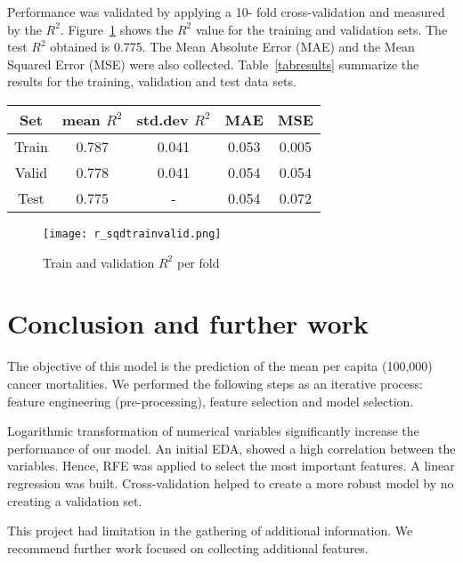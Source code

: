 \documentclass[twocolumn]{article}
\begin{document}
Performance was validated by applying a 10- fold cross-validation and measured by the $R^2$. Figure~\ref{fig:rsqrd_trainval} shows the $R^2$ value for the training and validation sets. The test $R^2$ obtained is 0.775. The Mean Absolute Error (MAE) and the Mean Squared Error (MSE) were also collected. Table~\ref{tabresults} summarize the results for the training, validation and test data sets.

\begin{center}\label{tabresults}
\begin{tabular}{ |c|c|c|c|c| } 
 \hline
 Set   &mean $R^2$ &std.dev $R^2$   & MAE   & MSE \\
 \hline
 Train      &0.787      & 0.041                     &0.053  &0.005 \\ 
 Valid &0.778      &0.041                      &0.054  & 0.054\\ 
 Test       & 0.775     &-                          &0.054  & 0.072\\ 
 \hline
\end{tabular}
\end{center}

\begin{figure}
    \centering
    \texttt{[image: r\_sqdtrainvalid.png]}
    \caption{Train and validation $R^2$ per fold}
    \label{fig:rsqrd_trainval}
\end{figure}

\section{Conclusion and further work}\label{secconclusion}

The objective of this model is the prediction of the mean per capita (100,000) cancer mortalities. We performed the following steps as an iterative process: feature engineering (pre-processing), feature selection and model selection. 

Logarithmic transformation of numerical variables significantly increase the performance of our model. An initial EDA, showed a high correlation between the variables. Hence, RFE was applied to select the most important features. A linear regression was built. Cross-validation helped to create a more robust model by no creating a validation set.

This project had limitation in the gathering of additional information. We recommend further work focused on collecting additional features.
\end{document}
